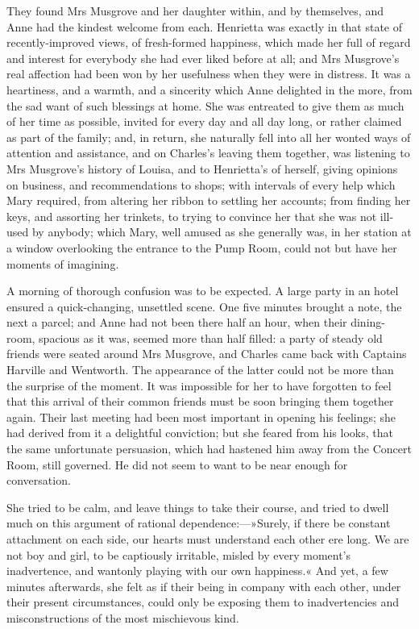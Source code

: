 They found Mrs Musgrove and her daughter within, and by themselves, and Anne had the kindest welcome from each. Henrietta was exactly in that state of recently-improved views, of fresh-formed happiness, which made her full of regard and interest for everybody she had ever liked before at all; and Mrs Musgrove's real affection had been won by her usefulness when they were in distress. It was a heartiness, and a warmth, and a sincerity which Anne delighted in the more, from the sad want of such blessings at home. She was entreated to give them as much of her time as possible, invited for every day and all day long, or rather claimed as part of the family; and, in return, she naturally fell into all her wonted ways of attention and assistance, and on Charles's leaving them together, was listening to Mrs Musgrove's history of Louisa, and to Henrietta's of herself, giving opinions on business, and recommendations to shops; with intervals of every help which Mary required, from altering her ribbon to settling her accounts; from finding her keys, and assorting her trinkets, to trying to convince her that she was not ill-used by anybody; which Mary, well amused as she generally was, in her station at a window overlooking the entrance to the Pump Room, could not but have her moments of imagining.

A morning of thorough confusion was to be expected. A large party in an hotel ensured a quick-changing, unsettled scene. One five minutes brought a note, the next a parcel; and Anne had not been there half an hour, when their dining-room, spacious as it was, seemed more than half filled: a party of steady old friends were seated around Mrs Musgrove, and Charles came back with Captains Harville and Wentworth. The appearance of the latter could not be more than the surprise of the moment. It was impossible for her to have forgotten to feel that this arrival of their common friends must be soon bringing them together again. Their last meeting had been most important in opening his feelings; she had derived from it a delightful conviction; but she feared from his looks, that the same unfortunate persuasion, which had hastened him away from the Concert Room, still governed. He did not seem to want to be near enough for conversation.

She tried to be calm, and leave things to take their course, and tried to dwell much on this argument of rational dependence:—»Surely, if there be constant attachment on each side, our hearts must understand each other ere long. We are not boy and girl, to be captiously irritable, misled by every moment's inadvertence, and wantonly playing with our own happiness.« And yet, a few minutes afterwards, she felt as if their being in company with each other, under their present circumstances, could only be exposing them to inadvertencies and misconstructions of the most mischievous kind.

